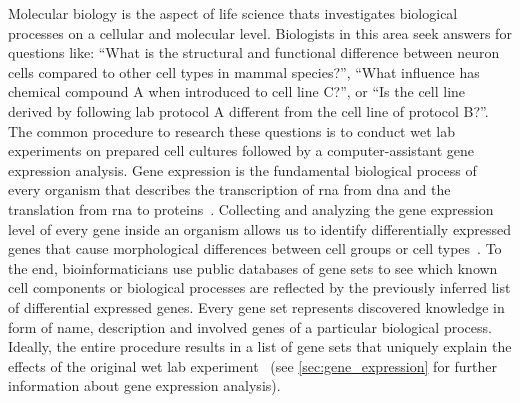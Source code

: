 \documentclass{thesisclass}
\begin{document}
Molecular biology is the aspect of life science thats investigates biological processes on a cellular and molecular level. Biologists in this area seek answers for questions like: ``What is the structural and functional difference between neuron cells compared to other cell types in mammal species?'', ``What influence has chemical compound A when introduced to cell line C?'', or ``Is the cell line derived by following lab protocol A different from the cell line of protocol B?''.
The common procedure to research these questions is to conduct wet lab experiments on prepared cell cultures followed by a computer-assistant gene expression analysis. 
Gene expression is the fundamental biological process of every organism that describes the transcription of \acrfull{rna} from \acrfull{dna} and the translation from \acrshort{rna} to proteins~\cite{citeulike:691434}. 
Collecting and analyzing the gene expression level of every gene inside an organism allows us to identify differentially expressed genes that cause morphological differences between cell groups or cell types~\cite{doi:10.1093/bioinformatics/btp616}. To the end, bioinformaticians use public databases of gene sets to see which known cell components or biological processes are reflected by the previously inferred list of differential expressed genes. 
Every gene set represents discovered knowledge in form of name, description and involved genes of a particular biological process. 
Ideally, the entire procedure results in a list of gene sets that uniquely explain the effects of the original wet lab experiment~\cite{doi:10.1093/nar/gks461} (see \autoref{sec:gene_expression} for further information about gene expression analysis).
\end{document}
